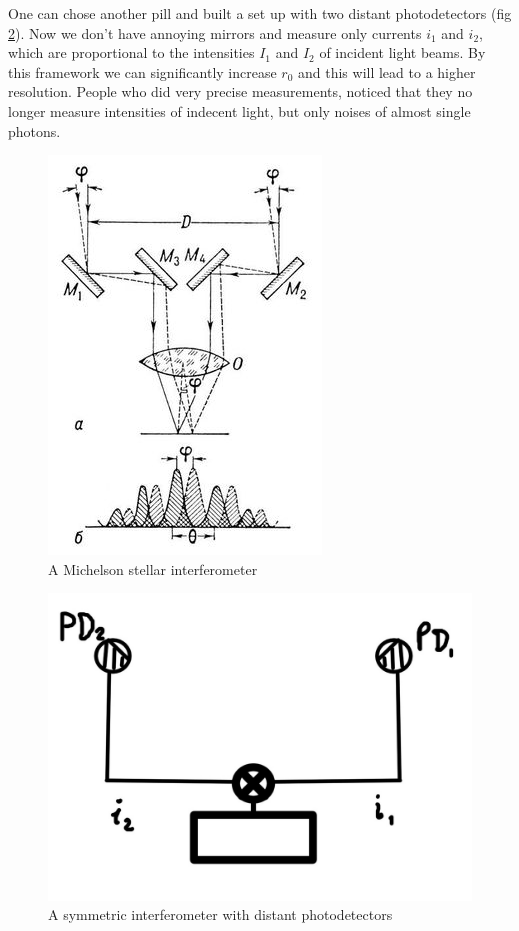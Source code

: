 One can chose another pill and built a set up with two distant photodetectors (fig \ref{fig:new_stellar}). Now we don't have annoying mirrors and measure only currents $i_1$ and $i_2$, which are proportional to the intensities $I_1$ and $I_2$ of incident light beams. By this framework we can significantly increase $r_0$ and this will lead to a higher resolution. People who did very precise measurements, noticed that they no longer measure intensities of indecent light, but only noises of almost single photons.


\begin{figure}
	\centering
	\includegraphics[width=0.6\linewidth]{fig/L3/stellar}
	\caption{A Michelson stellar interferometer}
	\label{fig:stellar}
\end{figure}


\begin{figure}
	\centering
	\includegraphics[width=0.5\linewidth]{fig/L3/new_stellar}
	\caption{A symmetric interferometer with distant photodetectors}
	\label{fig:new_stellar}
\end{figure}




